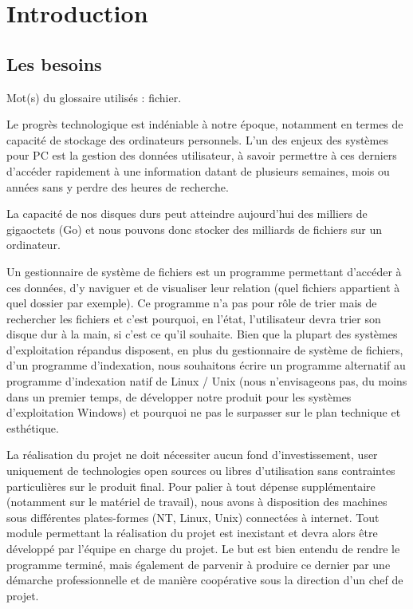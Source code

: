 \chapter{Introduction}

\section{Les besoins}
Mot(s) du glossaire utilisés : \gls{fichier}.

Le progrès technologique est indéniable à notre époque, notamment en termes de  capacité de stockage des ordinateurs personnels. L'un des enjeux des systèmes pour PC est la gestion des données utilisateur, à savoir permettre à ces derniers d'accéder rapidement à une information datant de plusieurs semaines, mois ou années sans y perdre des heures de recherche.

La capacité de nos disques durs peut atteindre aujourd'hui des milliers de gigaoctets (Go) et nous pouvons donc stocker des milliards de fichiers sur un ordinateur.

Un gestionnaire de système de fichiers est un programme permettant d'accéder à ces données, d'y naviguer et de visualiser leur relation (quel fichiers appartient à quel dossier par exemple). Ce programme n'a pas pour rôle de trier mais de rechercher les fichiers et c'est pourquoi, en l'état, l'utilisateur devra trier son disque dur à la main, si c'est ce qu'il souhaite. Bien que la plupart des systèmes d'exploitation répandus disposent, en plus du gestionnaire de système de fichiers, d'un programme d'indexation, nous souhaitons écrire un programme alternatif au programme d'indexation natif de Linux / Unix (nous n'envisageons pas, du moins dans un premier temps, de développer notre produit pour les systèmes d'exploitation Windows) et pourquoi ne pas le surpasser sur le plan technique et esthétique.

La réalisation du projet ne doit nécessiter aucun fond d'investissement, user uniquement de technologies open sources ou libres d'utilisation sans contraintes particulières sur le produit final. Pour palier à tout dépense supplémentaire (notamment sur le matériel de travail), nous avons à disposition des machines sous différentes plates-formes (NT, Linux, Unix) connectées à internet. Tout module permettant la réalisation du projet est inexistant et devra alors être développé par l'équipe en charge du projet.
Le but est bien entendu de rendre le programme terminé, mais également de parvenir à produire ce dernier par une démarche professionnelle et de manière coopérative sous la direction d'un chef de projet.


